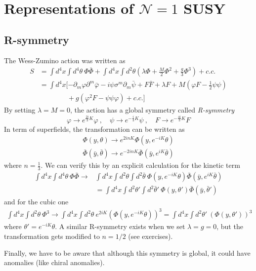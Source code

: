 \documentclass[a4paper,12pt]{article}
\numberwithin{equation}{section}
\numberwithin{exe}{section}
\newcommand{\p}{{\partial}}
\newcommand{\yb}{{\bar y}}
\newcommand{\Fb}{{\bar F}}
\renewcommand{\l}{{\lambda}}
\newcommand{\s}{{\sigma}}
\renewcommand{\t}{{\theta}}
\newcommand{\tb}{{\bar\theta}}
\newcommand{\vphi}{{\varphi}}
\newcommand{\vphib}{{\bar\varphi}}
\newcommand{\Phib}{{\bar \Phi}}
\newcommand{\psib}{{\bar\psi}}
\begin{document}
\section{Representations of $\mathcal N=1$ SUSY}

\subsection{R-symmetry}
The Wess-Zumino action was written as
	\begin{align}
	S & = \int d^4 x \int d^4 \t\ \Phi\Phib + \int d^4 x\int d^2 \t\left(\l\Phi +\frac{M}{2} \Phi^2+\frac{g}{3}\Phi^3\right) + c.c. \nonumber \\
	& = \int d^4 x[-\p_m\vphi\p^m\vphib - i\psi\s^m\p_m\psib + F\Fb + \l F + M(\vphi F-\frac12\psi\psi) \nonumber \\
	& \qquad\qquad + g(\vphi^2 F - \psi\psi\vphi) + c.c.]
	\end{align}
By setting $\l = M = 0$, the action has a global symmetry called {\it R-symmetry}
	\begin{equation}
	\vphi\rightarrow e^{\frac{2i}{3}K}\vphi\ ,\quad\psi\rightarrow e^{-\frac{i}{3}K}\psi\ ,\quad F\rightarrow e^{-\frac{4i}{3}K}F
	\end{equation}
In term of superfields, the transformation can be written as
	\begin{align}
	\Phi(y,\t) \rightarrow e^{2inK}\Phi(y,e^{-iK}\t) \\
	\Phib(\yb,\tb) \rightarrow e^{-2inK}\Phib(\yb,e^{iK}\tb)
	\end{align}
where $n=\frac13$. We can verify this by an explicit calculation for the kinetic term
	\begin{align}
	\int d^4 x\int d^4\t\ \Phi\Phib \rightarrow & \int d^4 x\int d^2\t \int d^2\tb\ \Phi(y,e^{-iK}\t)\Phib(\yb,e^{iK}\tb) \\
	& = \int d^4 x\int d^2\t' \int d^2\tb'\ \Phi(y,\t')\Phib(\yb,\tb')
	\end{align}
and for the cubic one
	\begin{align}
	\int d^4 x\int d^2\t\ \Phi^3 \rightarrow \int d^4 x\int d^2\t\ e^{2iK}\left(\Phi(y,e^{-iK}\t)\right)^3 = \int d^4 x\int d^2\t'\ \left(\Phi(y,\t')\right)^3
	\end{align}
where $\t' = e^{-iK}\t$. A similar R-symmetry exists when we set $\l = g =0$, but the transformation gets modified to $n=1/2$ (see exercises).

Finally, we have to be aware that although this symmetry is global, it could have anomalies (like chiral anomalies). 
\end{document}
